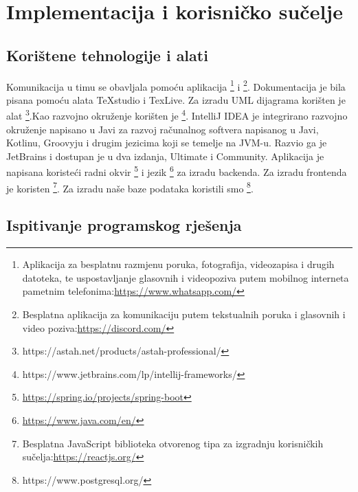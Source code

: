 \chapter{Implementacija i korisničko sučelje}
		
		
		\section{Korištene tehnologije i alati}
		
			
			 {Komunikacija u timu se obavljala pomoću aplikacija \footnote{Aplikacija za besplatnu razmjenu poruka, fotografija, videozapisa i drugih datoteka, te uspostavljanje glasovnih i videopoziva putem mobilnog interneta pametnim telefonima:\newline\url{https://www.whatsapp.com/}} i \footnote{Besplatna aplikacija za komunikaciju putem tekstualnih poruka i glasovnih i video poziva:\newline\url{https://discord.com/}}.
			 	\newline Dokumentacija je bila pisana pomoću alata TeXstudio i TexLive. Za izradu UML dijagrama korišten je alat \footnote{https://astah.net/products/astah-professional/}.Kao razvojno okruženje korišten je \footnote{https://www.jetbrains.com/lp/intellij-frameworks/}. IntelliJ IDEA je integrirano razvojno okruženje napisano u Javi za razvoj računalnog softvera napisanog u Javi, Kotlinu, Groovyju i drugim jezicima koji se temelje na JVM-u. Razvio ga je JetBrains i dostupan je u dva izdanja, Ultimate i Community. Aplikacija je napisana koristeći radni okvir \footnote{\url{https://spring.io/projects/spring-boot}} i jezik \footnote{\url{https://www.java.com/en/}} za izradu backenda. Za izradu frontenda je koristen \footnote{Besplatna JavaScript biblioteka otvorenog tipa za izgradnju korisničkih sučelja:\newline\url{https://reactjs.org/}}. Za izradu naše baze podataka koristili smo \footnote{https://www.postgresql.org/}.}
			
			
			\eject 
		
	
		\section{Ispitivanje programskog rješenja}
			
